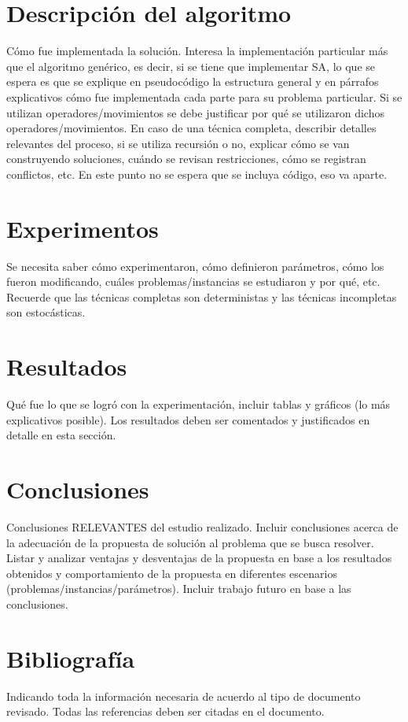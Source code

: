 \documentclass[letter, 10pt]{article}
\begin{document}
\section{Descripci\'on del algoritmo}
C\'omo fue implementada la soluci\'on. Interesa la implementaci\'on particular m\'as que el algoritmo gen\'erico, es decir, si se tiene que implementar SA, lo que se espera es que se explique en pseudoc\'odigo la estructura
general y en p\'arrafos explicativos c\'omo fue implementada cada parte para su problema particular. Si
se utilizan operadores/movimientos se debe justificar por qu\'e se utilizaron dichos operadores/movimientos. 
En caso de una t\'ecnica completa, describir detalles relevantes del proceso, si se utiliza recursi\'on o no, explicar c\'omo se van construyendo soluciones, cu\'ando se revisan restricciones, c\'omo se registran conflictos, etc. En este punto no se espera que se incluya c\'odigo, eso va aparte.

\section{Experimentos}
Se necesita saber c\'omo experimentaron, c\'omo definieron par\'ametros, 
c\'omo los fueron modificando, cu\'ales problemas/instancias se estudiaron y por qu\'e, etc. 
Recuerde que las t\'ecnicas completas son deterministas y las t\'ecnicas incompletas son estoc\'asticas.

\section{Resultados}
Qu\'e fue lo que se logr\'o con la experimentaci\'on, incluir tablas y gr\'aficos (lo m\'as explicativos posible).
Los resultados deben ser comentados y justificados en detalle en esta secci\'on.

\section{Conclusiones}
Conclusiones RELEVANTES del estudio realizado. Incluir conclusiones acerca de la adecuaci\'on de la propuesta de soluci\'on al problema que se busca resolver. Listar y analizar ventajas y desventajas de la propuesta en base a los resultados obtenidos y comportamiento de la propuesta en diferentes escenarios (problemas/instancias/par\'ametros). Incluir trabajo futuro en base a las conclusiones.

\section{Bibliograf\'ia}
Indicando toda la informaci\'on necesaria de acuerdo al tipo de documento revisado. Todas las referencias deben ser citadas en el documento.



\end{document}
